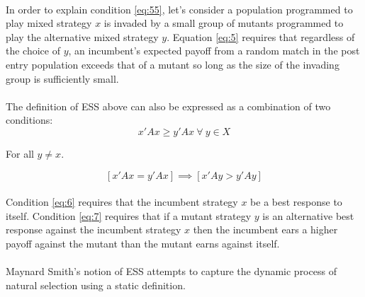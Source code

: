 \paragraph{}In order to explain condition \ref{eq:55}, let's consider a population programmed to play mixed strategy $x$ is invaded by a small group of mutants programmed to play the alternative mixed strategy $y$. Equation \ref{eq:5} requires that regardless of the choice of $y$, an incumbent's expected payoff from a random match in the post entry population exceeds that of a mutant so long as the size of the invading group is sufficiently small.
\paragraph{}The definition of ESS above can also be expressed as a combination of two conditions: 
\begin{equation}\label{eq:6}
x' A x \geq y' A x  \: \forall  \: y \in X
\end{equation}
\begin{center}
For all $y \neq x.$
\end{center}
\begin{equation}\label{eq:7}
[x' A x = y' A x] \implies [x' A y > y' A y]
\end{equation}
\paragraph{}Condition \ref{eq:6} requires that the incumbent strategy $x$ be a best response to itself. Condition \ref{eq:7} requires that if a mutant strategy $y$ is an alternative best response against the incumbent strategy $x$ then the incumbent ears a higher payoff against the mutant than the mutant earns against itself.
\paragraph{}Maynard Smith's notion of ESS attempts to capture the dynamic process of natural selection using a static definition.


